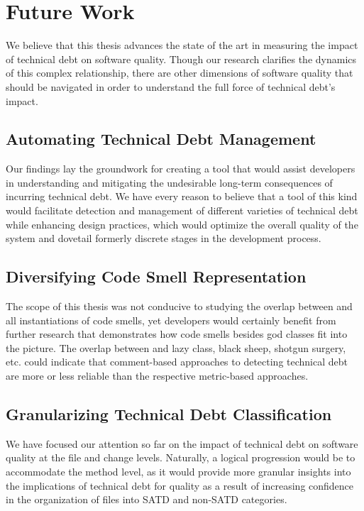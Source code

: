 \section{Future Work}

We believe that this thesis advances the state of the art in measuring the impact of technical debt on software quality. Though our research clarifies the dynamics of this complex relationship, there are other dimensions of software quality that should be navigated in order to understand the full force of technical debt's impact.

\subsection{Automating Technical Debt Management}

Our findings lay the groundwork for creating a tool that would assist developers in understanding and mitigating the undesirable long-term consequences of incurring technical debt. We have every reason to believe that a tool of this kind would facilitate detection and management of different varieties of technical debt while enhancing design practices, which would optimize the overall quality of the system and dovetail formerly discrete stages in the development process.


\subsection{Diversifying Code Smell Representation}

The scope of this thesis was not conducive to studying the overlap between \SATD and all instantiations of code smells, yet developers would certainly benefit from further research that demonstrates how code smells besides god classes fit into the picture. The overlap between \SATD and lazy class, black sheep, shotgun surgery, etc. could indicate that comment-based approaches to detecting technical debt are more or less reliable than the respective metric-based approaches.

\subsection{Granularizing Technical Debt Classification}

We have focused our attention so far on the impact of technical debt on software quality at the file and change levels. Naturally, a logical progression would be to accommodate the method level, as it would provide more granular insights into the implications of technical debt for quality as a result of increasing confidence in the organization of files into SATD and non-SATD categories.
